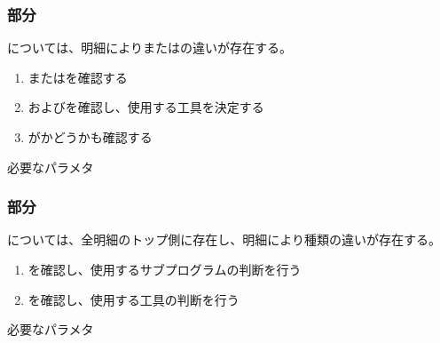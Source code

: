 \subsubsection{\OutcutMilling 部分}
\OutcutMilling については、明細により\OutcutExists または\OutcutTaperExists の違いが存在する。
\begin{enumerate}[label=\sarrow]
\item \TopOutcutExists または\BottomOutcutExists を確認する
\item \TopOutcutTaperExists および\BottomOutcutTaperExists を確認し、使用する工具を決定する
\item \nameOutcut が\CurvedOutcut かどうかも確認する
\end{enumerate}
\begin{Parameter}{必要なパラメタ}
\PMTopOutcutExists%
\PMBottomOutcutExists\\
\PMTopOutcutTaperExists%
\PMBottomOutcutTaperExists%
\end{Parameter}

\subsubsection{\KeywayMilling 部分}
\KeywayMilling については、全明細のトップ側に存在し、明細により種類の違いが存在する。
\begin{enumerate}[label=\sarrow]
\item \nameKeywayCornerType を確認し、使用するサブプログラムの判断を行う
\item \nameKeywayWidth を確認し、使用する工具の判断を行う
\end{enumerate}
\begin{Parameter}{必要なパラメタ}
\PMKeywayCornerType%
\PMTopOutcutExists%
\PMKeywayWidth%
\end{Parameter}

